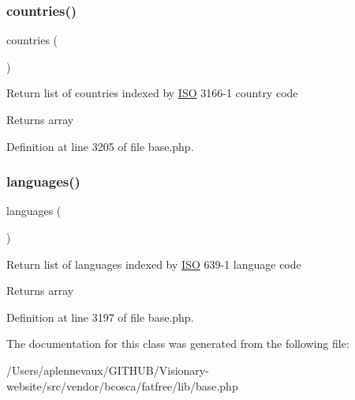 \subsubsection{\texorpdfstring{countries()}{countries()}}
{\footnotesize\ttfamily countries (\begin{DoxyParamCaption}{ }\end{DoxyParamCaption})}

Return list of countries indexed by \hyperlink{class_i_s_o}{I\+SO} 3166-\/1 country code \begin{DoxyReturn}{Returns}
array 
\end{DoxyReturn}


Definition at line 3205 of file base.\+php.

\hypertarget{class_i_s_o_adda8fc15b6fe0efc05a50d2645189c77}{}\label{class_i_s_o_adda8fc15b6fe0efc05a50d2645189c77} 
\subsubsection{\texorpdfstring{languages()}{languages()}}
{\footnotesize\ttfamily languages (\begin{DoxyParamCaption}{ }\end{DoxyParamCaption})}

Return list of languages indexed by \hyperlink{class_i_s_o}{I\+SO} 639-\/1 language code \begin{DoxyReturn}{Returns}
array 
\end{DoxyReturn}


Definition at line 3197 of file base.\+php.



The documentation for this class was generated from the following file\+:\begin{DoxyCompactItemize}
\item 
/\+Users/aplennevaux/\+G\+I\+T\+H\+U\+B/\+Visionary-\/website/src/vendor/bcosca/fatfree/lib/base.\+php\end{DoxyCompactItemize}
